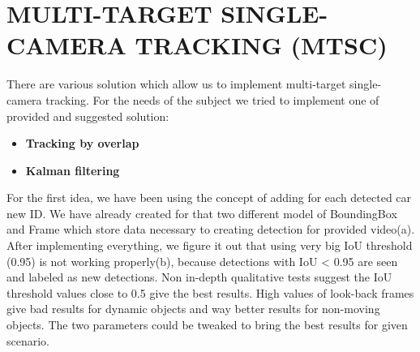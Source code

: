 \documentclass[journal, a4paper]{IEEEtran}
\begin{document}
\section{MULTI-TARGET SINGLE-CAMERA TRACKING (MTSC)}
\label{sec:MTSC}
There are various solution which allow us to implement multi-target single-camera tracking. For the needs of the subject we tried to implement one of provided and suggested solution:
\begin{itemize}
\item \textbf{Tracking by overlap}
\item \textbf{Kalman filtering}
\end{itemize}
For the first idea, we have been using the concept of adding for each detected car new ID. We have already created for that two different model of BoundingBox and Frame which store data necessary to creating detection for provided video(a). After implementing everything, we figure it out that using very big IoU threshold (0.95) is not working properly(b), because detections with IoU < 0.95 are seen and labeled as new detections. Non in-depth qualitative tests suggest the IoU threshold values close to 0.5 give the best results. High values of look-back frames give bad results for dynamic objects and way better results for non-moving objects. The two parameters could be tweaked to bring the best results for given scenario.
\end{document}
